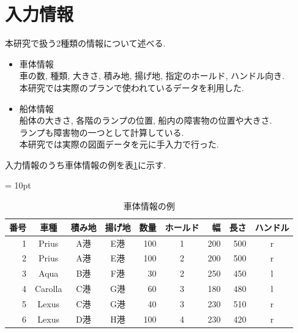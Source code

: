 \section{入力情報}
本研究で扱う2種類の情報について述べる.

\begin{itemize}
    \item 車体情報 \\
    車の数, 種類, 大きさ, 積み地, 揚げ地, 指定のホールド, ハンドル向き. \\
    本研究では実際のプランで使われているデータを利用した.
    \item 船体情報 \\
    船体の大きさ, 各階のランプの位置, 船内の障害物の位置や大きさ. \\
    ランプも障害物の一つとして計算している. \\
    本研究では実際の図面データを元に手入力で行った. \\ 

\end{itemize}
入力情報のうち車体情報の例を表\ref{table21}に示す.

\begin{table}[htbp]
    \tabcolsep = 10pt
    \renewcommand{\arraystretch}{0.7}
    \caption{車体情報の例}
    \label{table21}
    \begin{center}
    \begin{tabular}{rcccrcrrc} 
        \hline
    番号 & 車種 & 積み地 & 揚げ地 & 数量 & ホールド & 幅 & 長さ & ハンドル\\ 
    \hline
    1 & Prius & A港 & E港 & 100 & 1 & 200 & 500 & r \\
    2 & Prius & A港 & E港 & 100 & 2 & 200 & 500 & r \\
    3 & Aqua & B港 & F港 & 30 & 2 & 250 & 450 & l \\
    4 & Carolla & C港 & G港 & 60 & 3 & 180 & 480 & l \\
    5 & Lexus & C港 & G港 & 40 & 3 & 230 & 510 & r \\
    6 & Lexus & D港 & H港 & 100 & 4 & 230 & 420 & r \\
    \hline
    \end{tabular}
    \end{center}
    \end{table}



